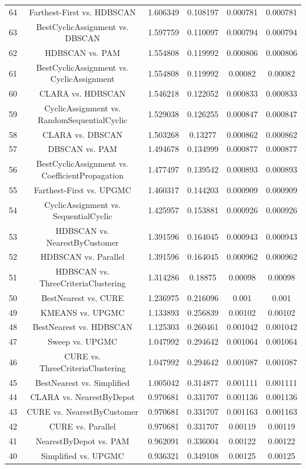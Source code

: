 \documentclass[a4paper,10pt]{article}
\begin{document}
\begin{landscape}
\begin{table}[!htp]
\begin{tabular}{cccccc}
64&Farthest-First vs. HDBSCAN&1.606349&0.108197&0.000781&0.000781\\
63&BestCyclicAssignment vs. DBSCAN&1.597759&0.110097&0.000794&0.000794\\
62&HDBSCAN vs. PAM&1.554808&0.119992&0.000806&0.000806\\
61&BestCyclicAssignment vs. CyclicAssignment&1.554808&0.119992&0.00082&0.00082\\
60&CLARA vs. HDBSCAN&1.546218&0.122052&0.000833&0.000833\\
59&CyclicAssignment vs. RandomSequentialCyclic&1.529038&0.126255&0.000847&0.000847\\
58&CLARA vs. DBSCAN&1.503268&0.13277&0.000862&0.000862\\
57&DBSCAN vs. PAM&1.494678&0.134999&0.000877&0.000877\\
56&BestCyclicAssignment vs. CoefficientPropagation&1.477497&0.139542&0.000893&0.000893\\
55&Farthest-First vs. UPGMC&1.460317&0.144203&0.000909&0.000909\\
54&CyclicAssignment vs. SequentialCyclic&1.425957&0.153881&0.000926&0.000926\\
53&HDBSCAN vs. NearestByCustomer&1.391596&0.164045&0.000943&0.000943\\
52&HDBSCAN vs. Parallel&1.391596&0.164045&0.000962&0.000962\\
51&HDBSCAN vs. ThreeCriteriaClustering&1.314286&0.18875&0.00098&0.00098\\
50&BestNearest vs. CURE&1.236975&0.216096&0.001&0.001\\
49&KMEANS vs. UPGMC&1.133893&0.256839&0.00102&0.00102\\
48&BestNearest vs. HDBSCAN&1.125303&0.260461&0.001042&0.001042\\
47&Sweep vs. UPGMC&1.047992&0.294642&0.001064&0.001064\\
46&CURE vs. ThreeCriteriaClustering&1.047992&0.294642&0.001087&0.001087\\
45&BestNearest vs. Simplified&1.005042&0.314877&0.001111&0.001111\\
44&CLARA vs. NearestByDepot&0.970681&0.331707&0.001136&0.001136\\
43&CURE vs. NearestByCustomer&0.970681&0.331707&0.001163&0.001163\\
42&CURE vs. Parallel&0.970681&0.331707&0.00119&0.00119\\
41&NearestByDepot vs. PAM&0.962091&0.336004&0.00122&0.00122\\
40&Simplified vs. UPGMC&0.936321&0.349108&0.00125&0.00125\\

\end{tabular}
\end{table}
\end{landscape}
\end{document}
